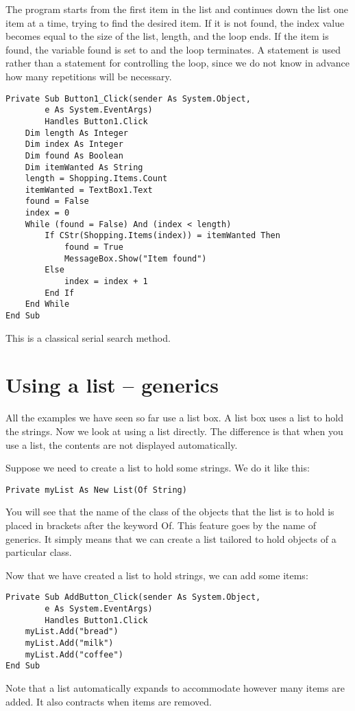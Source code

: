 		The program starts from the first item in the list and continues down the list one item at a time, trying to find the desired item. If it is not found, the index value becomes equal to the size of the list, length, and the loop ends. If the item is found, the  variable found is set to  and the loop terminates. A  statement is used rather than a  statement for controlling the loop, since we do not know in advance how many repetitions will be necessary.
		\begin{lstlisting}
Private Sub Button1_Click(sender As System.Object,
		e As System.EventArgs)
		Handles Button1.Click
	Dim length As Integer
	Dim index As Integer
	Dim found As Boolean
	Dim itemWanted As String
	length = Shopping.Items.Count
	itemWanted = TextBox1.Text
	found = False
	index = 0
	While (found = False) And (index < length)
		If CStr(Shopping.Items(index)) = itemWanted Then
			found = True
			MessageBox.Show("Item found")
		Else
			index = index + 1
		End If
	End While
End Sub
		\end{lstlisting}
		This is a classical serial search method.


	\section{Using a list – generics}
		All the examples we have seen so far use a list box. A list box uses a list to hold the strings. Now we look at using a list directly. The difference is that when you use a list, the contents are not displayed automatically.
		
		Suppose we need to create a list to hold some strings. We do it like this:
		\begin{lstlisting}
Private myList As New List(Of String)
		\end{lstlisting}
		You will see that the name of the class of the objects that the list is to hold is placed in brackets after the keyword Of. This feature goes by the name of generics. It simply means that we can create a list tailored to hold objects of a particular class.
		
		Now that we have created a list to hold strings, we can add some items:
		\begin{lstlisting}
Private Sub AddButton_Click(sender As System.Object,
		e As System.EventArgs)
		Handles Button1.Click
	myList.Add("bread")
	myList.Add("milk")
	myList.Add("coffee")
End Sub
		\end{lstlisting}
		Note that a list automatically expands to accommodate however many items are added. It also contracts when items are removed.
		
